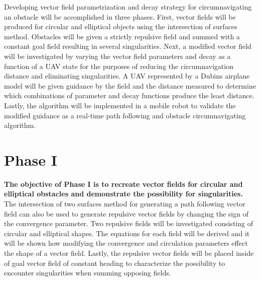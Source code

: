 \documentclass[numbered,pdftex]{ohio-etd}
\begin{document}
Developing vector field parametrization and decay strategy for circumnavigating an obstacle will be accomplished in three phases. First, vector fields will be produced for circular and elliptical objects using the intersection of surfaces method. Obstacles will be given a strictly repulsive field and summed with a constant goal field resulting in several singularities. Next, a modified vector field will be investigated by varying the vector field parameters and decay as a function of a UAV state for the purposes of reducing the circumnavigation distance and eliminating singularities. A UAV represented by a Dubins airplane model will be given guidance by the field and the distance measured to determine which combinations of parameter and decay functions produce the least distance. Lastly, the algorithm will be implemented in a mobile robot to validate the modified guidance as a real-time path following and obstacle circumnavigating algorithm. 


\section{Phase I}
\textbf{The objective of Phase I is to recreate vector fields for circular and elliptical obstacles and demonstrate the possibility for singularities.} The intersection of two surfaces method for generating a path following vector field can also be used to generate repulsive vector fields by changing the sign of the convergence parameter. Two repulsive fields will be investigated consisting of circular and elliptical shapes. The equations for each field will be derived and it will be shown how modifying the convergence and circulation parameters effect the shape of a vector field. Lastly, the repulsive vector fields will be placed inside of goal vector field of constant heading to characterize the possibility to encounter singularities when summing opposing fields. 
\end{document}
